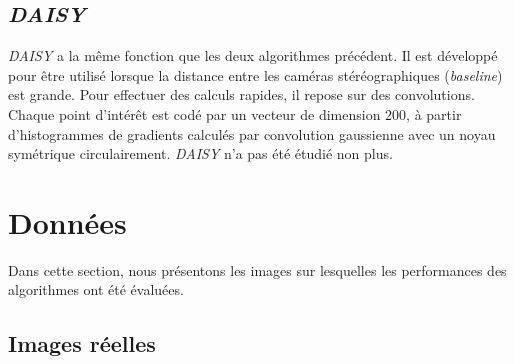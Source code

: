 \documentclass[
	a4paper, %
	10pt, %
	unnumberedsections, %
	twoside, %
]{LTJournalArticle}
\begin{document}
\subsection{\textit{DAISY}}

\textit{DAISY} \autocite{DAISY} a la même fonction que les deux algorithmes précédent.
Il est développé pour être utilisé lorsque la distance entre les caméras stéréographiques (\textit{baseline}) est grande.
Pour effectuer des calculs rapides, il repose sur des convolutions.
Chaque point d'intérêt est codé par un vecteur de dimension $200$, à partir d'histogrammes de gradients
calculés par convolution gaussienne avec un noyau symétrique circulairement.
\textit{DAISY} n'a pas été étudié non plus.


\section{Données}

Dans cette section, nous présentons les images sur lesquelles les performances des algorithmes ont été évaluées.

\subsection{Images réelles}
\end{document}

